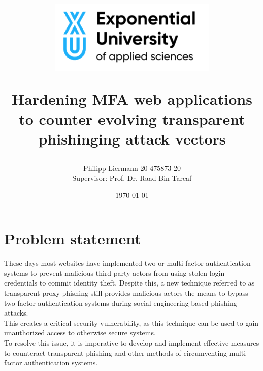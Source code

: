 \documentclass[12pt]{scrbook}
\begin{document}
\author{Philipp Liermann 20-475873-20\\Supervisor: Prof. Dr. Raad Bin Tareaf}
\date{\today}

\title{ \begin{center} \includegraphics[width=8cm]{./images/logo.png}
\end{center} \vspace{2cm} Hardening MFA web applications to counter evolving
transparent phishinging attack vectors \vspace{2cm} \large }

\maketitle

\newpage \tableofcontents

\newpage \section{Problem statement} These days most websites have implemented
two or multi-factor authentication systems to prevent malicious third-party
actors from using stolen login credentials to commit identity theft. Despite
this, a new technique referred to as transparent proxy phishing still provides
malicious actors the means to bypass two-factor authentication systems during
social engineering based phishing attacks.\\This creates a critical security
vulnerability, as this technique can be used to gain unauthorized access to
otherwise secure systems.\\To resolve this issue, it is imperative to develop
and implement effective measures to counteract transparent phishing and other
methods of circumventing multi-factor authentication systems.
\end{document}
